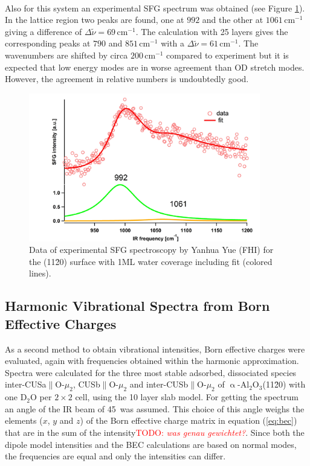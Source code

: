 \documentclass[11pt,DIV=13,BCOR=5mm,a4paper,headinclude]{scrbook}
\newcommand\todo[1]{\textcolor{red}{TODO: \textit{{#1}}}}
\begin{document}
\\
Also for this system an experimental SFG spectrum was obtained (see Figure \ref{abb:exp-sfg_fully}).
In the lattice region two peaks are found, one at $992$ and the other at $1061\,$cm$^{-1}$ giving a difference of $\Delta \tilde{\nu}=69\,$cm$^{-1}$.
The calculation with 25 layers gives the corresponding peaks at $790$ and $851\,$cm$^{-1}$ %
with a $\Delta \tilde{\nu}=61\,$cm$^{-1}$.
The wavenumbers are shifted by circa $200\,$cm$^{-1}$ compared to experiment but it is expected that low energy modes are in worse agreement than OD stretch modes.
However, the agreement in relative numbers is undoubtedly good.
\begin{figure}[!h]
 \centering
\includegraphics[width=0.9\textwidth]{figures/11-20/ssp_UHV_200K_fit_hydrox.jpg}
 \caption{Data of experimental SFG spectroscopy by Yanhua Yue (FHI) for the (11\=20) surface with 1ML water coverage including fit (colored lines).}
        \label{abb:exp-sfg_fully}
 \end{figure}



\subsection{Harmonic Vibrational Spectra from Born Effective Charges}\label{bec}
As a second method to obtain vibrational intensities, Born effective charges were evaluated, again with frequencies obtained within the harmonic approximation.
Spectra were calculated for the three most stable adsorbed, dissociated species inter-CUSa$\parallel$O-$\mu_2$, CUSb$\parallel$O-$\mu_2$ and inter-CUSb$\parallel$O-$\mu_2$ of $\upalpha$-Al$_2$O$_3$(11\=20) with one D$_2$O per $2\times 2$ cell, using the 10 layer slab model.
For getting the spectrum an angle of the IR beam of 45\textdegree~was assumed.
This choice of this angle weighs the elements ($x$, $y$ and $z$) of the Born effective charge matrix in equation (\ref{eq:bec}) that are in the sum of the intensity\todo{was genau gewichtet?}.
Since both the dipole model intensities and the BEC calculations are based on normal modes, the frequencies are equal and only the intensities can differ.
\end{document}
